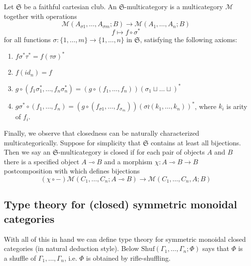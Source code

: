 \documentclass[acmsmall,screen, nonacm, anonymous]{acmart}
\begin{document}
\begin{definition}
  Let $\mathfrak{S}$ be a faithful cartesian club. An $\mathfrak{S}$-multicategory is a multicategory $\mathcal{M}$ together with operations
  \[
  \mathcal{M}(A_{\sigma 1}, \ldots, A_{\sigma m};B) \to \mathcal{M}(A_1, \ldots, A_n;B)
  \]
  \[
  f \mapsto f \circ \sigma^{*}
  \]
  for all functions $\sigma : \{1, \ldots, m\} \to \{1, \ldots, n\}$ in $\mathfrak{S}$, satisfying the following axioms:
  \begin{enumerate}
    \item $f\sigma^{*}\tau^{*} = f(\tau \sigma)^{*}$
    \item $f(id_n) = f$
    \item $g \circ (f_1\sigma^{*}_{1}, \ldots, f_{n}\sigma^{*}_n) = (g \circ (f_1, \ldots, f_n))(\sigma_1 \sqcup \ldots \sqcup)^{*}$
    \item $g \sigma^{*} \circ (f_1, \ldots, f_n) = (g \circ (f_{\sigma 1}, \ldots, f_{\sigma_m}))(\sigma \wr (k_1, \ldots, k_n))^{*}$, where $k_i$ is arity of $f_i$.
  \end{enumerate}
\end{definition}

Finally, we observe that closedness can be naturally characterized multicategorically.
Suppose for simplicity that $\mathfrak{S}$ contains at least all bijections. 
Then we say an $\mathfrak{S}$-multicategory is closed if for each pair of objects $A$ and $B$ there is a
specified object $A \multimap B$ and a morphism $\chi : A \multimap B \to B $ postcomposition
with which defines bijections
\[
(\chi \circ -) \mathcal{M}(C_1, \ldots, C_n; A \multimap B) \to \mathcal{M}(C_1, \ldots, C_n, A; B)
\]

\subsection{Type theory for (closed) symmetric monoidal categories}

With all of this in hand we can define type theory for symmetric monoidal closed categories (in natural deduction style).
Below $\text{Shuf}(\Gamma_1, \ldots, \Gamma_n; \Phi)$ says that $\Phi$ is a shuffle of $\Gamma_1, \ldots, \Gamma_n$, i.e. $\Phi$ is obtained by rifle-shuffling.
\end{document}

